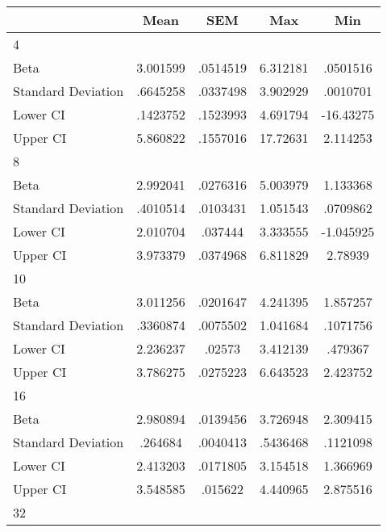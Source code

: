 {
\def\sym#1{\ifmmode^{#1}\else\(^{#1}\)\fi}
\begin{tabular}{l*{1}{cccc}}
\hline\hline
                    &        Mean&         SEM&         Max&         Min\\
\hline
4                   &            &            &            &            \\
Beta                &    3.001599&    .0514519&    6.312181&    .0501516\\
Standard Deviation  &    .6645258&    .0337498&    3.902929&    .0010701\\
Lower CI            &    .1423752&    .1523993&    4.691794&   -16.43275\\
Upper CI            &    5.860822&    .1557016&    17.72631&    2.114253\\
\hline
8                   &            &            &            &            \\
Beta                &    2.992041&    .0276316&    5.003979&    1.133368\\
Standard Deviation  &    .4010514&    .0103431&    1.051543&    .0709862\\
Lower CI            &    2.010704&     .037444&    3.333555&   -1.045925\\
Upper CI            &    3.973379&    .0374968&    6.811829&     2.78939\\
\hline
10                  &            &            &            &            \\
Beta                &    3.011256&    .0201647&    4.241395&    1.857257\\
Standard Deviation  &    .3360874&    .0075502&    1.041684&    .1071756\\
Lower CI            &    2.236237&      .02573&    3.412139&     .479367\\
Upper CI            &    3.786275&    .0275223&    6.643523&    2.423752\\
\hline
16                  &            &            &            &            \\
Beta                &    2.980894&    .0139456&    3.726948&    2.309415\\
Standard Deviation  &     .264684&    .0040413&    .5436468&    .1121098\\
Lower CI            &    2.413203&    .0171805&    3.154518&    1.366969\\
Upper CI            &    3.548585&     .015622&    4.440965&    2.875516\\
\hline
32                  &            &            &            &            \\

\end{tabular}}
